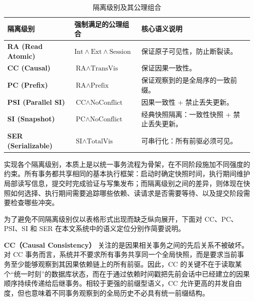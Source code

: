 \begin{table}[htbp]
  \centering
  \renewcommand{\arraystretch}{1.5}
  \caption{隔离级别及其公理组合}
  \label{tab:isolation_levels_axioms}
  \begin{tabular}{|l|l|l|}
    \hline
    \textbf{隔离级别}               & \textbf{强制满足的公理组合}                                   & \textbf{核心语义说明}        \\
    \hline
    \textbf{RA (Read Atomic)}   & $\text{Int} \wedge \text{Ext} \wedge \text{Session}$ & 保证原子可见性，防止断裂读。         \\
    \hline
    \textbf{CC (Causal)}        & $\text{RA} \wedge \text{TransVis}$                   & 保证因果一致性。               \\
    \hline
    \textbf{PC (Prefix)}        & $\text{RA} \wedge \text{Prefix}$                     & 保证观察到的是全局序的一致前缀。       \\
    \hline
    \textbf{PSI (Parallel SI)}  & $\text{CC} \wedge \text{NoConflict}$                 & 因果一致性 + 禁止丢失更新。        \\
    \hline
    \textbf{SI (Snapshot)}      & $\text{PC} \wedge \text{NoConflict}$                 & 经典快照隔离：一致性快照 + 禁止丢失更新。 \\
    \hline
    \textbf{SER (Serializable)} & $\text{SI} \wedge \text{TotalVis}$                   & 可串行化：所有前驱必须可见。         \\
    \hline
  \end{tabular}
\end{table}

实现各个隔离级别，本质上是以统一事务流程为骨架，在不同阶段施加不同强度的约束。所有事务都共享相同的基本执行框架：启动时确定快照时间，执行期间维护局部读写信息，提交时完成验证与写集发布；而隔离级别之间的差异，则体现在快照如何选择、执行期间需要追踪哪些依赖、读请求是否需要等待、以及提交阶段需要检查哪些冲突。

为了避免不同隔离级别仅以表格形式出现而缺乏纵向展开，下面对 CC、PC、PSI、SI 和 SER 在本文系统中的语义定位分别作简要说明。

\textbf{CC（Causal Consistency）} 关注的是因果相关事务之间的先后关系不被破坏。对 CC 事务而言，系统并不要求所有事务共享同一个全局快照，而是要求当前事务至少能够观察到其因果依赖链上的所有前驱。因此，CC 的关键不在于读取某个“统一时刻”的数据库状态，而在于通过依赖时间戳把先前会话中已经建立的因果顺序持续传递给后继事务。相较于更强的前缀型语义，CC 允许更高的并发自由度，但也意味着不同事务观察到的全局历史不必具有统一前缀结构。


